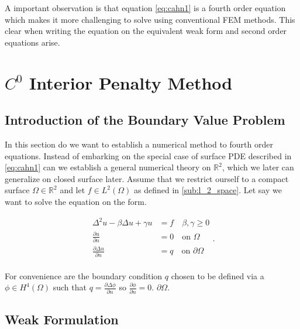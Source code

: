 A important observation is that equation \eqref{eq:cahn1} is a fourth order equation which makes it more challenging to
solve using conventional FEM methods. This clear when writing the equation on the equivalent weak form and second order
equations arise.


\section{$C^0$ Interior Penalty Method}
\label{sec:ch1}

\subsection{Introduction of the Boundary Value Problem}%
\label{sub:introduction_of_the_bvp}


In this section do we want to establish a numerical method to fourth order equations. Instead of embarking on the
special case of surface PDE described in \eqref{eq:cahn1} can we establish a general numerical theory on $\mathbb{R} ^2$, which we later can generalize on closed surface later. Assume that we restrict ourself to a compact surface $\Omega \in \mathbb{R} ^2 $ and let $f \in L^{2}\left( \Omega
\right) $ as defined in \ref{sub:l_2_space}.
Let say we want to solve the equation on the form.

\begin{equation}
\label{eq:ch1_bvp}
\begin{split}
    \Delta ^2 u - \beta \Delta u + \gamma u &= f \quad \beta , \gamma \ge 0 \\
    \frac{\partial u}{\partial  n}  &= 0 \quad \text{on }\Omega  \\
    \frac{\partial \Delta u}{\partial  n}  &= q \quad \text{on } \partial \Omega  \\
\end{split}
.\end{equation}

For convenience are the boundary condition $q$ chosen to be defined via a  $\phi \in H^{4}\left( \Omega  \right)$
such that $q = \frac{\partial \Delta \phi }{\partial  n} $ so $\frac{\partial \phi }{\partial  n}  = 0$.
$\partial \Omega $.


\subsection{Weak Formulation}%
\label{sub:weak_formulation}

